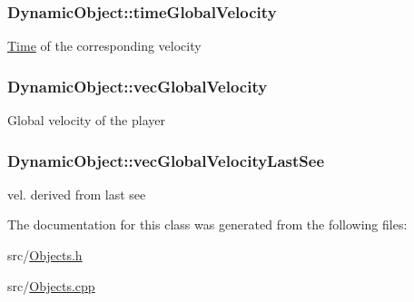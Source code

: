 \subsubsection[{\texorpdfstring{time\+Global\+Velocity}{timeGlobalVelocity}}]{ Dynamic\+Object\+::time\+Global\+Velocity\hspace{0.3cm}{\ttfamily [protected]}}\hypertarget{classDynamicObject_a145bad5d089c8bcb80fbc797efa32e41}{}\label{classDynamicObject_a145bad5d089c8bcb80fbc797efa32e41}
\hyperlink{classTime}{Time} of the corresponding velocity 
\subsubsection[{\texorpdfstring{vec\+Global\+Velocity}{vecGlobalVelocity}}]{ Dynamic\+Object\+::vec\+Global\+Velocity\hspace{0.3cm}{\ttfamily [protected]}}\hypertarget{classDynamicObject_a64067c37d37e3484fea758cf388586e2}{}\label{classDynamicObject_a64067c37d37e3484fea758cf388586e2}
Global velocity of the player 
\subsubsection[{\texorpdfstring{vec\+Global\+Velocity\+Last\+See}{vecGlobalVelocityLastSee}}]{ Dynamic\+Object\+::vec\+Global\+Velocity\+Last\+See\hspace{0.3cm}{\ttfamily [protected]}}\hypertarget{classDynamicObject_a61dfb8e440f2f045dccfb1b8e3759bae}{}\label{classDynamicObject_a61dfb8e440f2f045dccfb1b8e3759bae}
vel. derived from last see 

The documentation for this class was generated from the following files\+:\begin{DoxyCompactItemize}
\item 
src/\hyperlink{Objects_8h}{Objects.\+h}\item 
src/\hyperlink{Objects_8cpp}{Objects.\+cpp}\end{DoxyCompactItemize}
